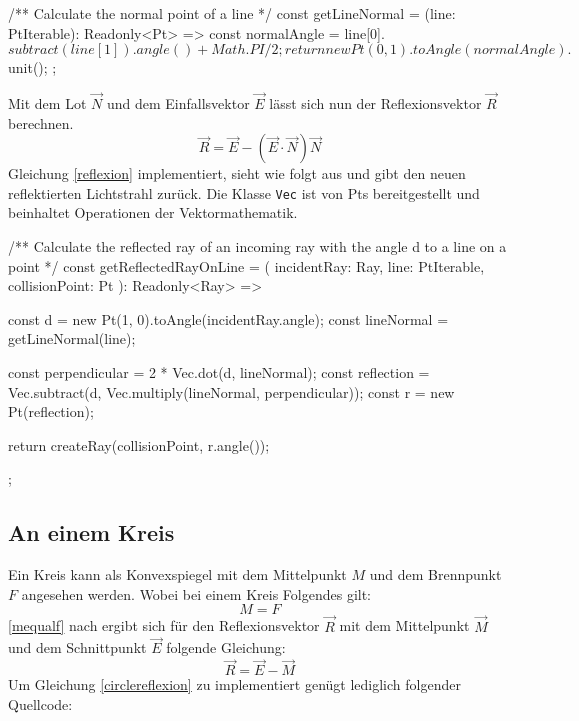 \begin{verbnobox}[\scriptsize\mbox{}]
/** Calculate the normal point of a line */
const getLineNormal = (line: PtIterable): Readonly<Pt> => {
    const normalAngle = line[0].$subtract(line[1]).angle() + Math.PI / 2;
    return new Pt(0, 1).toAngle(normalAngle).$unit();
};
\end{verbnobox}
Mit dem Lot $ \vec{N} $ und dem Einfallsvektor $ \vec{E} $ lässt sich nun der Reflexionsvektor $ \vec{R} $ berechnen. \parencite[vgl.][Kapitel 10]{cross2013raytracing}
\begin{equation}
    \label{reflexion}
    \vec{R} = \vec{E} - (\vec{E} \cdot \vec{N})\vec{N}
\end{equation}
Gleichung \ref{reflexion} implementiert, sieht wie folgt aus und gibt den neuen reflektierten Lichtstrahl zurück. 
Die Klasse \texttt{Vec} ist von Pts bereitgestellt und beinhaltet Operationen der Vektormathematik.

\begin{verbnobox}[\scriptsize\mbox{}]
/** Calculate the reflected ray of an incoming ray with the angle d to a line on a point */
const getReflectedRayOnLine = (
    incidentRay: Ray,
    line: PtIterable,
    collisionPoint: Pt
): Readonly<Ray> => {
    const d = new Pt(1, 0).toAngle(incidentRay.angle);
    const lineNormal = getLineNormal(line);

    const perpendicular = 2 * Vec.dot(d, lineNormal);
    const reflection = Vec.subtract(d, Vec.multiply(lineNormal, perpendicular));
    const r = new Pt(reflection);

    return createRay(collisionPoint, r.angle());
};
\end{verbnobox}

\subsection*{An einem Kreis}
Ein Kreis kann als Konvexspiegel mit dem Mittelpunkt $ M $ und dem Brennpunkt $ F $ angesehen werden. \parencite[vgl.][S. 362]{kuchling2004taschenbuch}
Wobei bei einem Kreis Folgendes gilt: 
\begin{equation}
    \label{mequalf}
    M = F
\end{equation}
\ref{mequalf} nach ergibt sich für den Reflexionsvektor $ \vec{R} $ mit dem Mittelpunkt $ \vec{M} $ und dem Schnittpunkt $ \vec{E} $ folgende Gleichung:
\begin{equation}
    \label{circlereflexion}
    \vec{R} = \vec{E} - \vec{M}
\end{equation}
Um Gleichung \ref{circlereflexion} zu implementiert genügt lediglich folgender Quellcode:

